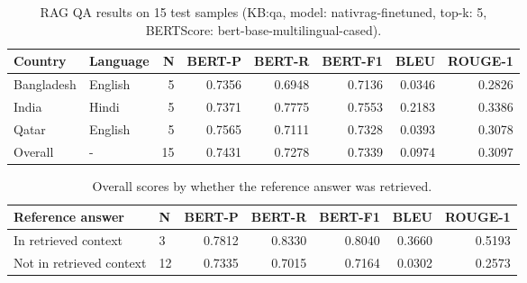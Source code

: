 \begin{table}[t]
\centering
\begin{tabular}{llrrrrrr}
\hline
Country & Language & N & BERT-P & BERT-R & BERT-F1 & BLEU & ROUGE-1 \\
\hline
Bangladesh & English & 5 & 0.7356 & 0.6948 & 0.7136 & 0.0346 & 0.2826 \\
India & Hindi & 5 & 0.7371 & 0.7775 & 0.7553 & 0.2183 & 0.3386 \\
Qatar & English & 5 & 0.7565 & 0.7111 & 0.7328 & 0.0393 & 0.3078 \\
Overall & - & 15 & 0.7431 & 0.7278 & 0.7339 & 0.0974 & 0.3097 \\
\hline
\end{tabular}
\caption{RAG QA results on 15 test samples (KB:qa, model: nativrag-finetuned, top-k: 5, BERTScore: bert-base-multilingual-cased).}
\label{tab:results}
\end{table}

\begin{table}[t]
\centering
\begin{tabular}{llrrrrr}
\hline
Reference answer & N & BERT-P & BERT-R & BERT-F1 & BLEU & ROUGE-1 \\
\hline
In retrieved context & 3 & 0.7812 & 0.8330 & 0.8040 & 0.3660 & 0.5193 \\
Not in retrieved context & 12 & 0.7335 & 0.7015 & 0.7164 & 0.0302 & 0.2573 \\
\hline
\end{tabular}
\caption{Overall scores by whether the reference answer was retrieved.}
\label{tab:results-context}
\end{table}
